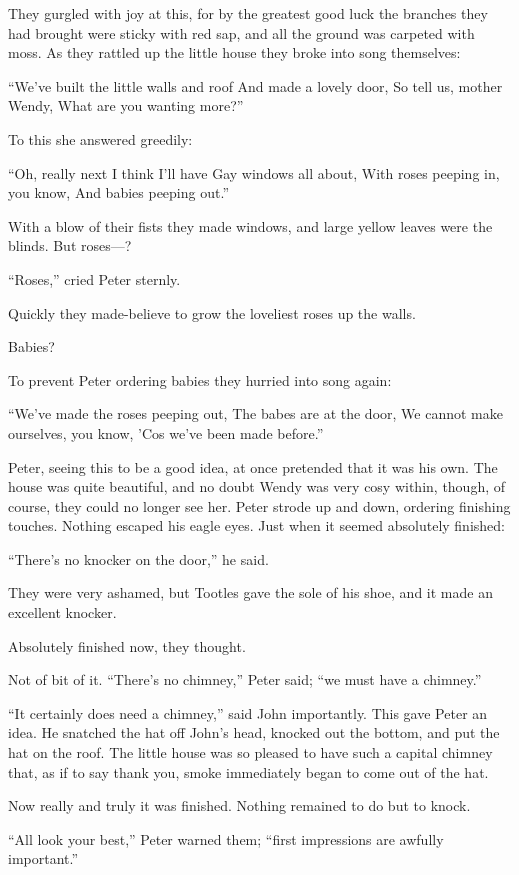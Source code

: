 They gurgled with joy at this, for by the greatest good luck the
branches they had brought were sticky with red sap, and all the ground
was carpeted with moss. As they rattled up the little house they broke
into song themselves:

``We've built the little walls and roof
    And made a lovely door,
So tell us, mother Wendy,
    What are you wanting more?''

To this she answered greedily:

``Oh, really next I think I'll have
    Gay windows all about,
With roses peeping in, you know,
    And babies peeping out.''

With a blow of their fists they made windows, and large yellow leaves
were the blinds. But roses—?

``Roses,'' cried Peter sternly.

Quickly they made-believe to grow the loveliest roses up the walls.

Babies?

To prevent Peter ordering babies they hurried into song again:

``We've made the roses peeping out,
    The babes are at the door,
We cannot make ourselves, you know,
    'Cos we've been made before.''

Peter, seeing this to be a good idea, at once pretended that it was his
own. The house was quite beautiful, and no doubt Wendy was very cosy
within, though, of course, they could no longer see her. Peter strode
up and down, ordering finishing touches. Nothing escaped his eagle
eyes. Just when it seemed absolutely finished:

``There's no knocker on the door,'' he said.

They were very ashamed, but Tootles gave the sole of his shoe, and it
made an excellent knocker.

Absolutely finished now, they thought.

Not of bit of it. ``There's no chimney,'' Peter said; ``we must have a
chimney.''

``It certainly does need a chimney,'' said John importantly. This gave
Peter an idea. He snatched the hat off John's head, knocked out the
bottom, and put the hat on the roof. The little house was so pleased to
have such a capital chimney that, as if to say thank you, smoke
immediately began to come out of the hat.

Now really and truly it was finished. Nothing remained to do but to
knock.

``All look your best,'' Peter warned them; ``first impressions are awfully
important.''

